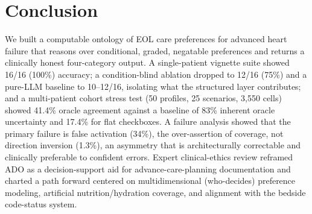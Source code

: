 \documentclass[10pt]{article}
\begin{document}
\section{Conclusion}
We built a computable ontology of EOL care preferences for advanced heart failure that reasons over conditional, graded, negatable preferences and returns a clinically honest four-category output. A single-patient vignette suite showed 16/16 (100\%) accuracy; a condition-blind ablation dropped to 12/16 (75\%) and a pure-LLM baseline to 10--12/16, isolating what the structured layer contributes; and a multi-patient cohort stress test (50 profiles, 25 scenarios, 3{,}550 cells) showed 41.4\% oracle agreement against a baseline of 83\% inherent oracle uncertainty and 17.4\% for flat checkboxes. A failure analysis showed that the primary failure is false activation (34\%), the over-assertion of coverage, not direction inversion (1.3\%), an asymmetry that is architecturally correctable and clinically preferable to confident errors. Expert clinical-ethics review reframed ADO as a decision-support aid for advance-care-planning documentation and charted a path forward centered on multidimensional (who-decides) preference modeling, artificial nutrition/hydration coverage, and alignment with the bedside code-status system.

\end{document}

